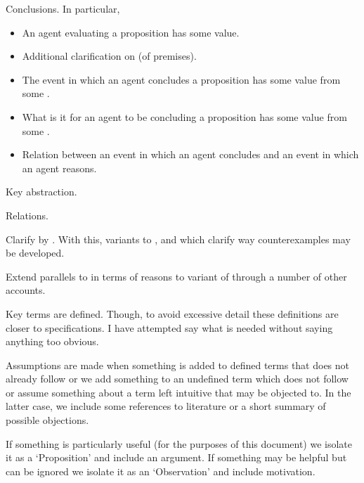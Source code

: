 \begin{note}
  \begin{TOCEnum}
  \item

    Conclusions.
    In particular,

    \begin{itemize}
    \item
      An agent evaluating a proposition has some value.
    \item
      Additional clarification on \pool{} (of premises).
    \item
      The event in which an agent concludes a proposition has some value from some \pool{}.
    \item
      What is it for an agent to be concluding a proposition has some value from some \pool{}.
    \item
      Relation between an event in which an agent concludes and an event in which an agent reasons.
    \end{itemize}
  \item

    Key abstraction.
  \item

    Relations.

    Clarify by .
    With this, variants to \qWhy{}, \qHow{} and \issueInclusion{} which clarify way counterexamples may be developed.
  \item

    Extend parallels to \issueInclusion{} in terms of reasons to variant of \issueInclusion{} through a number of other accounts.
  \end{TOCEnum}
\end{note}

\begin{note}
  Key terms are defined.
  Though, to avoid excessive detail these definitions are closer to specifications.
  I have attempted say what is needed without saying anything too obvious.

  Assumptions are made when something is added to defined terms that does not already follow or we add something to an undefined term which does not follow or assume something about a term left intuitive that may be objected to.
  In the latter case, we include some references to literature or a short summary of possible objections.

  If something is particularly useful (for the purposes of this document) we isolate it as a `Proposition' and include an argument.
  If something may be helpful but can be ignored we isolate it as an `Observation' and include motivation.
\end{note}

